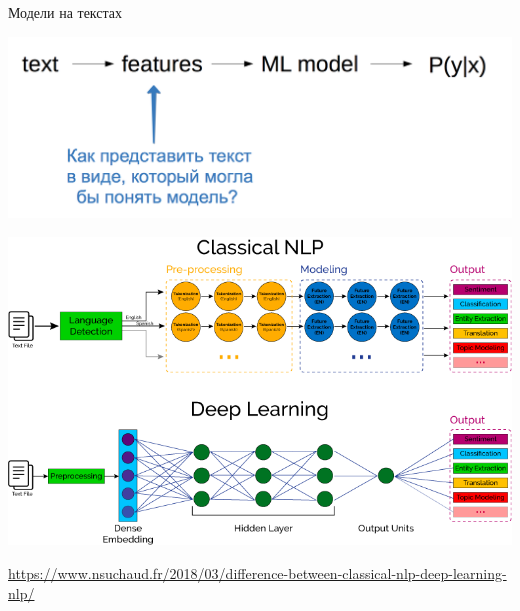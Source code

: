 \documentclass[notes,12pt, aspectratio=169]{beamer}
\begin{document}
\begin{frame}{Модели на текстах }
\begin{center}
	\includegraphics[width=.8\linewidth]{text1.png}
\end{center}
\end{frame} 


\begin{frame}
\begin{center}
	\includegraphics[width=0.8\paperwidth]{nn_vs_class.png}
\end{center}
\vfill
\footnotesize  {\color{blue} \url{https://www.nsuchaud.fr/2018/03/difference-between-classical-nlp-deep-learning-nlp/}}
\end{frame}
\end{document}
